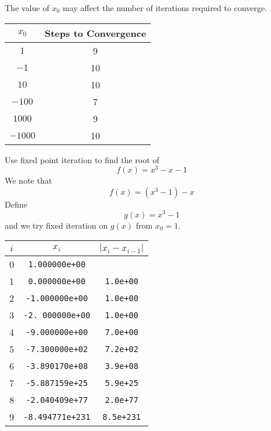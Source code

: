 \begin{remark}
    The value of \( x_0 \) may affect the number of iterations required to converge.

    \begin{table}[H]
        \centering
        \begin{tabular}{c|c}
            \( x_0 \)   & Steps to Convergence
            \\ \hline
            \( 1 \)     & 9
            \\
            \( -1 \)    & 10
            \\
            \( 10 \)    & 10
            \\
            \( -100 \)  & 7
            \\
            \( 1000 \)  & 9
            \\
            \( -1000 \) & 10
        \end{tabular}
    \end{table}
\end{remark}


\begin{example}
    Use fixed point iteration to find the root of \[
        f(x) = x^3 - x - 1
    \]
    We note that \[
        f(x) = (x^3 - 1) - x
    \] Define \[
        g(x) = x^3 - 1
    \] and we try fixed iteration on \( g(x) \) from \( x_0 = 1 \).

    \begin{table}[H]
        \centering
        \begin{tabular}{c|c|c}
            \( i \) & \( x_i \)               & \( | x_i - x_{i-1} | \) \\ \hline
            0       & \texttt{1.000000e+00}   &                         \\
            1       & \texttt{0.000000e+00}   & \texttt{1.0e+00}        \\
            2       & \texttt{-1.000000e+00}  & \texttt{1.0e+00}        \\
            3       & \texttt{-2. 000000e+00} & \texttt{1.0e+00}        \\
            4       & \texttt{-9.000000e+00}  & \texttt{7.0e+00}        \\
            5       & \texttt{-7.300000e+02}  & \texttt{7.2e+02}        \\
            6       & \texttt{-3.890170e+08}  & \texttt{3.9e+08}        \\
            7       & \texttt{-5.887159e+25}  & \texttt{5.9e+25}        \\
            8       & \texttt{-2.040409e+77}  & \texttt{2.0e+77}        \\
            9       & \texttt{-8.494771e+231} & \texttt{8.5e+231}
        \end{tabular}
    \end{table}
\end{example}